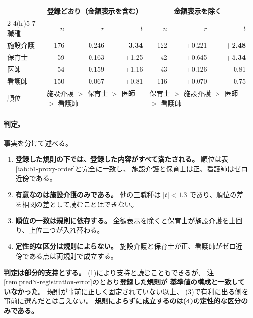 \begin{center}
\begin{tabular}{@{}lrrrrrr@{}}
\toprule
 & \multicolumn{3}{c}{登録どおり（金額表示を含む）} & \multicolumn{3}{c}{金額表示を除く} \\
\cmidrule(lr){2-4}\cmidrule(lr){5-7}
職種 & $n$ & $r$ & $t$ & $n$ & $r$ & $t$ \\
\midrule
施設介護 & 176 & +0.246 & \textbf{+3.34} & 122 & +0.221 & \textbf{+2.48} \\
保育士 & 59 & +0.163 & +1.25 & 42 & +0.645 & \textbf{+5.34} \\
医師 & 54 & +0.159 & +1.16 & 43 & +0.126 & +0.81 \\
看護師 & 150 & +0.067 & +0.81 & 116 & +0.070 & +0.75 \\
\midrule
順位 & \multicolumn{3}{l}{施設介護 $>$ 保育士 $>$ 医師 $>$ 看護師} & \multicolumn{3}{l}{保育士 $>$ 施設介護 $>$ 医師 $>$ 看護師} \\
\bottomrule
\end{tabular}
\label{tab:predY-result}
\end{center}

\paragraph{判定。}
事実を分けて述べる。

\begin{enumerate}[label=(\arabic*)]
\item \textbf{登録した規則の下では、登録した内容がすべて満たされる。}
順位は表\ref{tab:b1-proxy-order}と完全に一致し、
施設介護と保育士は正、看護師はゼロ近傍である。

\item \textbf{有意なのは施設介護のみである。}
他の三職種は $|t|<1.3$ であり、順位の差を相関の差として読むことはできない。

\item \textbf{順位の一致は規則に依存する。}
金額表示を除くと保育士が施設介護を上回り、上位二つが入れ替わる。

\item \textbf{定性的な区分は規則によらない。}
施設介護と保育士が正、看護師がゼロ近傍である点は両規則で成立する。
\end{enumerate}

\textbf{判定は部分的支持とする。} (1)により支持と読むこともできるが、
注\ref{rem:predY-registration-error}のとおり\textbf{登録した規則が
基準値の構成と一致していなかった}。
規則が事前に正しく固定されていない以上、
(3)で有利に出る側を事前に選んだとは言えない。
\textbf{規則によらずに成立するのは(4)の定性的な区分のみである。}

